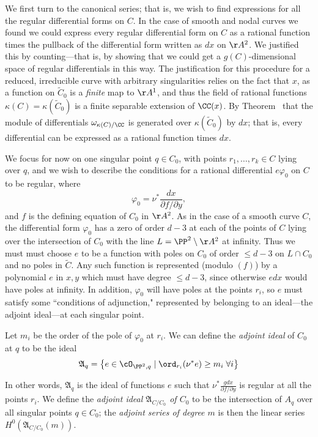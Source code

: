 We first turn to the canonical series; that is, we wish to find expressions for all the regular differential forms on $C$. In the case of smooth and nodal curves we found we could express every regular differential form
on $C$ as a rational function times the pullback of the differential form written as $dx$ on $\AA^2$. We justified this
by counting---that is, by showing that we could get a $g(C)$-dimensional space of regular differentials in this way. The justification for 
this procedure for a reduced, irreducible curve with arbitrary singularities relies on the fact that $x$, as a function on $\widetilde C_0$
is a \emph{finite} map to $\AA^1$, and thus the field of rational functions $\kappa(C) = \kappa(\widetilde C_0)$ is a finite
separable extension of $\CC(x)$. By Theorem~\cite[****]{Eisenbud1995} that the module of differentials 
$\omega_{\kappa(C)/\CC}$ is generated over $\kappa(\widetilde C_0)$ by $dx$; that is, every differential can be expressed as a rational function
times $dx$. 

We focus for now on one singular point $q \in C_0$, with points $r_1,\dots,r_k \in C$ lying over $q$, and we wish to describe the conditions for a rational differential $e\varphi_0$ on $C$ to be regular, where
$$
\varphi_0 = \nu^* \frac{dx}{\partial f/\partial y},
$$
and $f$ is the defining equation of $C_0$ in $\AA^2$. As in the case of a smooth curve $C$, the differential
form $\varphi_0$ has a zero of order $d-3$ at each of the points of $C$ lying over the intersection of $C_0$ with the line  $L = \PP^2\setminus \AA^2$
at infinity. Thus we must must choose $e$ to be a function with poles on $C_0$ of order $\leq d-3$ on $L\cap C_0$ and no poles in $\widetilde C$. Any such function is represented (modulo $(f)$) by 
a polynomial $e$ in $x,y$ which must have degree $\leq d-3$, since otherwise $edx$ would have poles at infinity. In addition, $\varphi_0$ will have poles at the points $r_i$,
so $e$ must satisfy some ``conditions of adjunction," represented by belonging to an ideal---the adjoint ideal---at each singular point.

Let $m_i$ be the order of the pole of $\varphi_0$ at $r_i$. We can define the \emph{adjoint ideal} of $C_0$ at $q$ to be the ideal
$$
\mathfrak A_{q} = \left\{ e \in \cO_{\PP^2, q} \mid \ord_{r_i}(\nu^*e) \geq m_i \; \forall i \right\}
$$

In other words, $\mathfrak A_q$ is the ideal of functions $e$ such that $\nu^* \frac{gdx}{\partial f/\partial y}$ is regular at all the points $r_i$. We define the \emph{adjoint ideal $\mathfrak A_{C/C_0}$ of $C_0$} to be the intersection of $A_q$ over all singular points  $q \in C_0$; the \emph{adjoint series of degree $m$} is then the linear series $H^0(\mathfrak A_{C/C_0}(m))$. 


